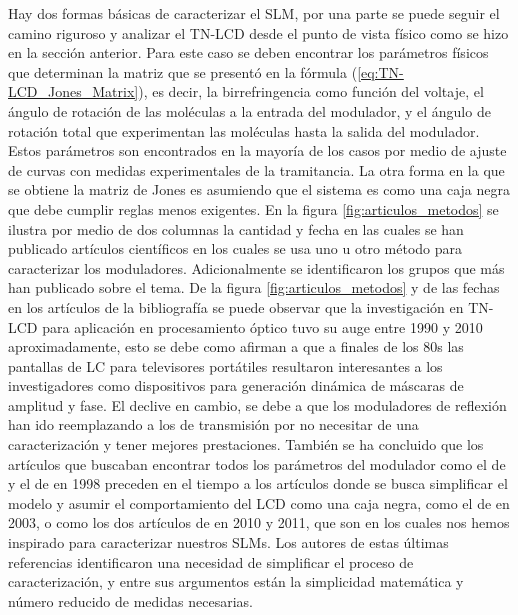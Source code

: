 Hay dos formas básicas de caracterizar el
SLM, por una parte se puede seguir el camino riguroso y analizar el
TN-LCD desde el punto de vista físico como se hizo en la sección
anterior. Para este caso se deben encontrar los parámetros físicos que
determinan la matriz que se presentó en la fórmula
(\ref{eq:TN-LCD_Jones_Matrix}), es decir, la 
birrefringencia como función del voltaje, el ángulo de rotación de las
moléculas a la entrada del modulador, y el ángulo de rotación total
que experimentan las moléculas hasta la salida del modulador. Estos
parámetros son encontrados en la mayoría de los casos por medio de
ajuste de curvas con medidas experimentales de la tramitancia.  La
otra forma en la que se obtiene la matriz de Jones es asumiendo que el
sistema es como una caja negra que debe cumplir reglas menos
exigentes. En la figura \ref{fig:articulos_metodos} se ilustra por
medio de dos columnas la cantidad y fecha en las cuales se han
publicado artículos científicos en los cuales se usa uno u otro método
para caracterizar los moduladores. Adicionalmente se identificaron los
grupos que más han publicado sobre el tema. De la figura
\ref{fig:articulos_metodos} y de las fechas en los artículos de la
bibliografía se puede observar que la investigación en TN-LCD para
aplicación en procesamiento óptico tuvo su auge entre 1990 y 2010
aproximadamente, esto se debe como afirman 
a que a finales de los 80s las pantallas 
de LC para televisores portátiles resultaron interesantes a los
investigadores como dispositivos para generación dinámica de máscaras
de amplitud y fase. El declive en cambio, se debe a que los
moduladores de reflexión han ido reemplazando a los de transmisión por
 no necesitar de una caracterización y tener mejores prestaciones. 
También se ha concluido que los artículos que buscaban encontrar todos los
parámetros del modulador como el de  y
el de  en 1998 preceden en el tiempo a los artículos
donde se busca simplificar el modelo y asumir el comportamiento del
LCD como una caja negra, como el de  en 2003, o
como los dos artículos de  en 2010 y
2011, que son en los cuales nos
hemos inspirado para caracterizar nuestros SLMs. Los autores de estas
últimas referencias identificaron una necesidad de 
simplificar el proceso de caracterización, y entre sus argumentos 
están la simplicidad matemática y número reducido de medidas necesarias.
